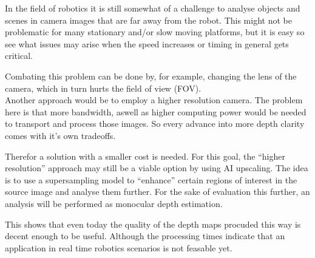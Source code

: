 In the field of robotics it is still somewhat of a challenge to analyse objects and scenes in camera images that are far away from the robot.
This might not be problematic for many stationary and/or slow moving platforms, but it is easy so see what issues may arise when the speed increases or timing in general gets critical.

Combating this problem can be done by, for example, changing the lens of the camera, which in turn hurts the field of view (FOV). \\
Another approach would be to employ a higher resolution camera. The problem here is that more bandwidth, aswell as higher computing power would be needed to transport and process those images.
So every advance into more depth clarity comes with it's own tradeoffs.

Therefor a solution with a smaller cost is needed. For this goal, the \enquote{higher resolution} approach may still be a viable option by using AI upscaling.
The idea is to use a supersampling model to \enquote{enhance} certain regions of interest in the source image and analyse them further.
For the sake of evaluation this further, an analysis will be performed as monocular depth estimation.

This shows that even today the quality of the depth maps procuded this way is decent enough to be useful. Although the processing times indicate that an application in real time robotics scenarios is not feasable yet.
